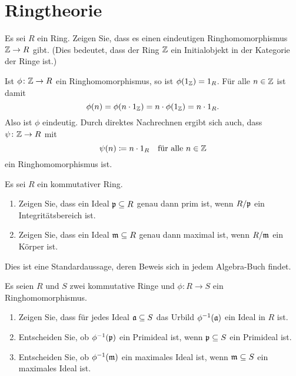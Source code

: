 \section{Ringtheorie}


\begin{question}
  Es sei $R$ ein Ring.
  Zeigen Sie, dass es einen eindeutigen Ringhomomorphismus $\mathbb{Z} \to R$ gibt.
  (Dies bedeutet, dass der Ring $\mathbb{Z}$ ein Initialobjekt in der Kategorie der Ringe ist.)
\end{question}


\begin{solution}
  Ist $\phi \colon \mathbb{Z} \to R$ ein Ringhomomorphismus, so ist $\phi(1_{\mathbb{Z}}) = 1_R$.
  Für alle $n \in \mathbb{Z}$ ist damit
  \[
      \phi(n)
    = \phi(n \cdot 1_{\mathbb{Z}})
    = n \cdot \phi(1_{\mathbb{Z}})
    = n \cdot 1_R.
  \]
  Also ist $\phi$ eindeutig.
  Durch direktes Nachrechnen ergibt sich auch, dass $\psi \colon \mathbb{Z} \to R$ mit
  \[
    \psi(n) \coloneqq n \cdot 1_R
    \quad
    \text{für alle $n \in \mathbb{Z}$}
  \]
  ein Ringhomomorphismus ist.
\end{solution}


\begin{question}
  Es sei $R$ ein kommutativer Ring.
  \begin{enumerate}
    \item
      Zeigen Sie, dass ein Ideal $\mathfrak{p} \subseteq R$ genau dann prim ist, wenn $R/\mathfrak{p}$ ein Integritätsbereich ist.
    \item
      Zeigen Sie, dass ein Ideal $\mathfrak{m} \subseteq R$ genau dann maximal ist, wenn $R/\mathfrak{m}$ ein Körper ist. 
  \end{enumerate}
\end{question}


\begin{solution}
  Dies ist eine Standardaussage, deren Beweis sich in jedem Algebra-Buch findet.
\end{solution}


\begin{question}[subtitle = Urbilder von Idealen]
  Es seien $R$ und $S$ zwei kommutative Ringe und $\phi \colon R \to S$ ein Ringhomomorphismus.
  \begin{enumerate}
    \item
      Zeigen Sie, dass für jedes Ideal $\mathfrak{a} \subseteq S$ das Urbild $\phi^{-1}(\mathfrak{a})$ ein Ideal in $R$ ist.
    \item
      Entscheiden Sie, ob $\phi^{-1}(\mathfrak{p})$ ein Primideal ist, wenn $\mathfrak{p} \subseteq S$ ein Primideal ist.
    \item
      Entscheiden Sie, ob $\phi^{-1}(\mathfrak{m})$ ein maximales Ideal ist, wenn $\mathfrak{m} \subseteq S$ ein maximales Ideal ist.
  \end{enumerate}
\end{question}


